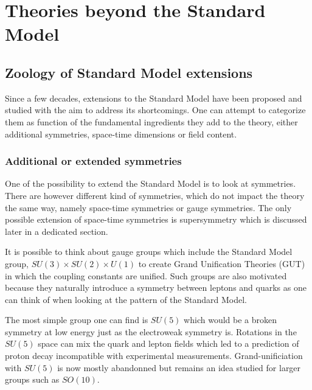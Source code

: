     \section{Theories beyond the Standard Model \label{sec:beyondTheStandardModel}}

        \subsection{Zoology of Standard Model extensions}

        Since a few decades, extensions to the Standard Model have been proposed and
        studied with the aim to address its shortcomings. One can attempt to categorize
        them as function of the fundamental ingredients they add to the theory, either
        additional symmetries, space-time dimensions or field content.

            \subsubsection{Additional or extended symmetries}

        One of the possibility to extend the Standard Model is to look at symmetries.
        There are however different kind of symmetries, which do not impact the theory
        the same way, namely space-time symmetries or gauge symmetries. The only possible
        extension of space-time symmetries is supersymmetry which is discussed later
        in a dedicated section.

        It is possible to think about gauge groups which include the Standard Model group,
        $SU(3) \times SU(2) \times U(1)$ to create Grand Unification Theories (GUT) in which
        the coupling constants are unified. Such groups are also motivated because they
        naturally introduce a symmetry between leptons and quarks as one can think of
        when looking at the pattern of the Standard Model.

        The most simple group one can find is $SU(5)$ \cite{SU5GUT} which would be a broken symmetry at
        low energy just as the electroweak symmetry is. Rotations in the $SU(5)$ space
        can mix the quark and lepton fields which led to a prediction of proton decay
        incompatible with experimental measurements. Grand-unificiation with $SU(5)$ is
        now mostly abandonned but remains an idea studied for larger groups such as $SO(10)$.

